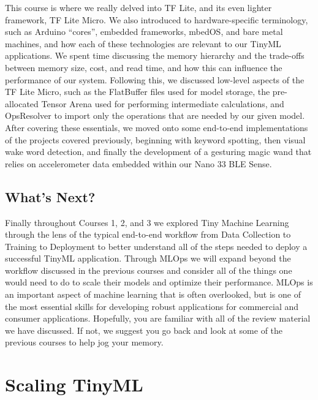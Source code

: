 This course is where we really delved into TF Lite, and its even lighter framework, TF Lite Micro. We also introduced to hardware-specific terminology, such as Arduino “cores”, embedded frameworks, mbedOS, and bare metal machines, and how each of these technologies are relevant to our TinyML applications. We spent time discussing the memory hierarchy and the trade-offs between memory size, cost, and read time, and how this can influence the performance of our system. Following this, we discussed low-level aspects of the TF Lite Micro, such as the FlatBuffer files used for model storage, the pre-allocated Tensor Arena used for performing intermediate calculations, and OpsResolver to import only the operations that are needed by our given model. After covering these essentials, we moved onto some end-to-end implementations of the projects covered previously, beginning with keyword spotting, then visual wake word detection, and finally the development of a gesturing magic wand that relies on accelerometer data embedded within our Nano 33 BLE Sense.

\subsection{What’s Next?}

Finally throughout Courses 1, 2, and 3 we explored Tiny Machine Learning through the lens of the typical end-to-end workflow from Data Collection to Training to Deployment to better understand all of the steps needed to deploy a successful TinyML application. Through MLOps we will expand beyond the workflow discussed in the previous courses and consider all of the things one would need to do to scale their models and optimize their performance. MLOps is an important aspect of machine learning that is often overlooked, but is one of the most essential skills for developing robust applications for commercial and consumer applications. Hopefully, you are familiar with all of the review material we have discussed. If not, we suggest you go back and look at some of the previous courses to help jog your memory.


\section{Scaling TinyML}

